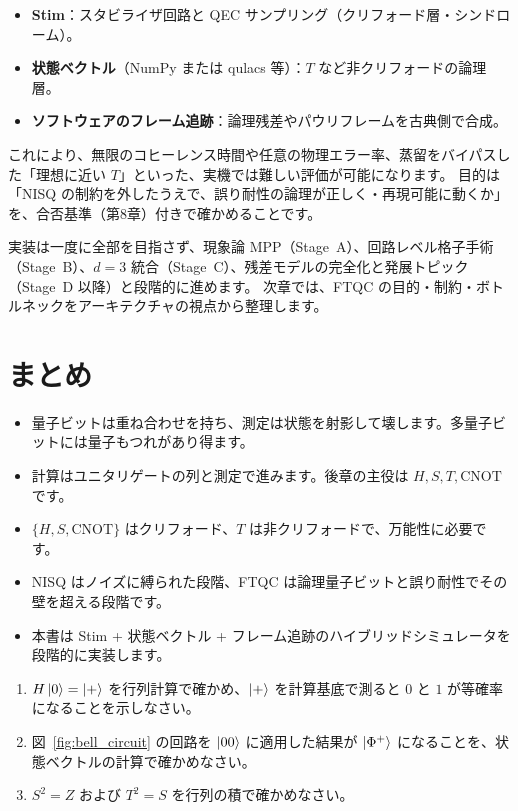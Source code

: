 \begin{itemize}
  \item \textbf{Stim}：スタビライザ回路と QEC サンプリング（クリフォード層・シンドローム）。
  \item \textbf{状態ベクトル}（NumPy または qulacs 等）：$T$ など非クリフォードの論理層。
  \item \textbf{ソフトウェアのフレーム追跡}：論理残差やパウリフレームを古典側で合成。
\end{itemize}

これにより、無限のコヒーレンス時間や任意の物理エラー率、蒸留をバイパスした「理想に近い $T$」といった、実機では難しい評価が可能になります。
目的は「NISQ の制約を外したうえで、誤り耐性の論理が正しく・再現可能に動くか」を、合否基準（第8章）付きで確かめることです。

実装は一度に全部を目指さず、現象論 MPP（Stage~A）、回路レベル格子手術（Stage~B）、$d=3$ 統合（Stage~C）、残差モデルの完全化と発展トピック（Stage~D 以降）と段階的に進めます。
次章では、FTQC の目的・制約・ボトルネックをアーキテクチャの視点から整理します。

\section{まとめ}\label{sec:overview_summary}

\begin{itemize}
  \item 量子ビットは重ね合わせを持ち、測定は状態を射影して壊します。多量子ビットには量子もつれがあり得ます。
  \item 計算はユニタリゲートの列と測定で進みます。後章の主役は $H,S,T,\mathrm{CNOT}$ です。
  \item $\{H,S,\mathrm{CNOT}\}$ はクリフォード、$T$ は非クリフォードで、万能性に必要です。
  \item NISQ はノイズに縛られた段階、FTQC は論理量子ビットと誤り耐性でその壁を超える段階です。
  \item 本書は Stim + 状態ベクトル + フレーム追跡のハイブリッドシミュレータを段階的に実装します。
\end{itemize}

\begin{exercise}
  \begin{enumerate}
    \item $H\ket{0}=\ket{+}$ を行列計算で確かめ、$\ket{+}$ を計算基底で測ると $0$ と $1$ が等確率になることを示しなさい。
    \item 図~\ref{fig:bell_circuit} の回路を $\ket{00}$ に適用した結果が $\ket{\Phi^+}$ になることを、状態ベクトルの計算で確かめなさい。
    \item $S^2=Z$ および $T^2=S$ を行列の積で確かめなさい。
  \end{enumerate}
\end{exercise}
